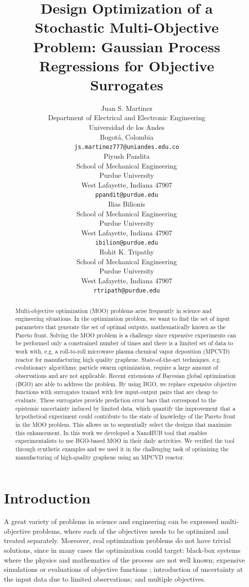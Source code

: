 \documentclass{article}
\title{Design Optimization of a Stochastic Multi-Objective Problem: Gaussian Process Regressions for Objective Surrogates}
\author{
  Juan S. Martinez\\
  Department of Electrical and Electronic Engineering\\
  Universidad de los Andes\\
  Bogotá, Colombia \\
  \texttt{js.martinez777@uniandes.edu.co} \\
  \And
  Piyush Pandita \\
  School of Mechanical Engineering \\
  Purdue University \\
  West Lafayette, Indiana 47907\\
  \texttt{ppandit@purdue.edu} \\
  \AND
  Ilias Bilionis \\
  School of Mechanical Engineering \\
  Purdue University \\
  West Lafayette, Indiana 47907\\
  \texttt{ibilion@purdue.edu} \\
  \And
  Rohit K. Tripathy \\
  School of Mechanical Engineering \\
  Purdue University \\
  West Lafayette, Indiana 47907\\
  \texttt{rtripath@purdue.edu} \\
}
\begin{document}

\maketitle

\begin{abstract}
    Multi-objective optimization (MOO) problems arise frequently in science and engineering situations. In the optimization problem, we want to find the set of input parameters that generate the set of optimal outputs, mathematically known as the Pareto front. Solving the MOO problem is a challenge since expensive experiments can be performed only a constrained number of times and there is a limited set of data to work with, e.g. a roll-to-roll microwave plasma chemical vapor deposition (MPCVD) reactor for manufacturing high quality graphene. State-of-the-art techniques, e.g. evolutionary algorithms; particle swarm optimization, require a large amount of observations and are not applicable. Recent extensions of Bayesian global optimization (BGO) are able to address the problem. By using BGO, we replace expensive objective functions with surrogates trained with few input-output pairs that are cheap to evaluate. These surrogates provide prediction error bars that correspond to the epistemic uncertainty induced by limited data, which quantify the improvement that a hypothetical experiment could contribute to the state of knowledge of the Pareto front in the MOO problem. This allows us to sequentially select the designs that maximize this enhancement. In this work we developed a NanoHUB tool that enables experimentalists to use BGO-based MOO in their daily activities. We verified the tool through synthetic examples and we used it in the challenging task of optimizing the manufacturing of high-quality graphene using an MPCVD reactor.
\end{abstract}

\section{Introduction}

A great variety of problems in science and engineering can be expressed multi-objective problems, where each of the objectives needs to be optimized and treated separately. Moreover, real optimization problems do not have trivial solutions, since in many cases the optimization could target: black-box systems where the physics and mathematics of the process are not well known; expensive simulations or evaluations of objective functions \cite{Jones1998}; introduction of uncertainty at the input data due to limited observations; and multiple objectives.
\end{document}
